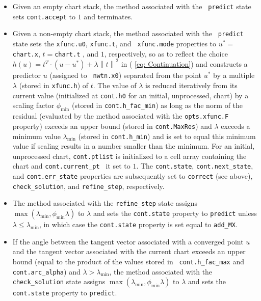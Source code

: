 \documentclass{article}
\begin{document}
\begin{itemize}
\item Given an empty chart stack, the method associated with the \texttt{%
predict} state sets \texttt{cont.accept} to $1$ and terminates.

\item Given a non-empty chart stack, the method associated with the \texttt{%
predict} state sets the \texttt{xfunc.u0}, \texttt{xfunc.t}, and \texttt{%
xfunc.mode} properties to $u^{\ast }=$\texttt{chart.x}, $t=$\texttt{chart.t}%
, and $1$, respectively, so as to reflect the choice $h\left( u\right)
=t^{T}\cdot \left( u-u^{\ast }\right) +\lambda \left\| t\right\| ^{2}$ in (%
\ref{eq: Continuation}) and constructs a predictor $u$ (assigned to \texttt{%
nwtn.x0}) separated from the point $u^{\ast }$ by a multiple $\lambda $
(stored in \texttt{xfunc.h}) of $t$. The value of $\lambda $ is reduced
iteratively from its current value (initialized at \texttt{cont.h0} for an
initial, unprocessed, chart) by a scaling factor $\phi _{\min }$ (stored in 
\texttt{cont.h\_fac\_min}) as long as the norm of the residual (evaluated by
the method associated with the \texttt{opts.xfunc.F} property) exceeds an
upper bound (stored in \texttt{cont.MaxRes}) and $\lambda $ exceeds a
minimum value $\lambda _{\min }$ (stored in \texttt{cont.h\_min}) and is set
to equal this minimum value if scaling results in a number smaller than the
minimum. For an initial, unprocessed chart, \texttt{cont.ptlist} is
initialized to a cell array containing the chart and \texttt{cont.current\_pt%
} it set to $1$. The \texttt{cont.state}, \texttt{cont.next\_state}, and 
\texttt{cont.err\_state} properties are subsequently set to \texttt{correct}
(see above), \texttt{check\_solution}, and \texttt{refine\_step},
respectively.

\item The method associated with the \texttt{refine\_step} state assigns $%
\max \left( \lambda _{\min },\phi _{\min }\lambda \right) $ to $\lambda $
and sets the \texttt{cont.state} property to \texttt{predict} unless $%
\lambda \leq \lambda _{\min }$, in which case the \texttt{cont.state}
property is set equal to \texttt{add\_MX}.

\item If the angle between the tangent vector associated with a converged
point $u$ and the tangent vector associated with the current chart exceeds
an upper bound (equal to the product of the values stored in \texttt{%
cont.h\_fac\_max} and \texttt{cont.arc\_alpha}) and $\lambda >\lambda _{\min
}$, the method associated with the \texttt{check\_solution} state assigns $%
\max \left( \lambda _{\min },\phi _{\min }\lambda \right) $ to $\lambda $
and sets the \texttt{cont.state} property to \texttt{predict}.


\end{itemize}
\end{document}
